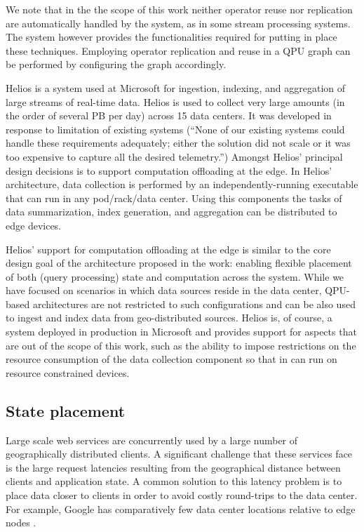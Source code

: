 We note that in the the scope of this work neither operator reuse nor replication are automatically handled by the system,
as in some stream processing systems.
The system however provides the functionalities required for putting in place these techniques.
Employing operator replication and reuse in a QPU graph can be performed by configuring the graph accordingly.

\bigskip
\noindent
Helios \cite{potharaju:helios} is a system used at Microsoft for ingestion, indexing, and aggregation of large streams
of real-time data.
Helios is used to collect very large amounts (in the order of several PB per day) across 15 data centers.
It was developed in response to limitation of existing systems
(``None of our existing systems could handle these requirements adequately; either the solution did not scale or it was
too expensive to capture all the desired telemetry.'')
Amongst Helios' principal design decisions is to support computation offloading at the edge.
In Helios' architecture, data collection is performed by an independently-running executable that can run in any pod/rack/data center.
Using this components the tasks of data summarization, index generation, and aggregation can be distributed to edge devices.

Helios' support for computation offloading at the edge is similar to the core design goal of the architecture proposed in the work:
enabling flexible placement of both (query processing) state and computation across the system.
While we have focused on scenarios in which data sources reside in the data center,
QPU-based architectures are not restricted to such configurations and can be also used to ingest and index data from geo-distributed
sources.
Helios is, of course, a system deployed in production in Microsoft and provides support for aspects that are out of the
scope of this work, such as the ability to impose restrictions on the resource consumption of the data collection component
so that in can run on resource constrained devices.

\subsection{State placement}
\label{sec:placement_state}
Large scale web services are concurrently used by a large number of geographically distributed clients.
A significant challenge that these services face is the large request latencies resulting from the geographical distance
between clients and application state.
A common solution to this latency problem is to place data closer to clients in order to avoid costly round-trips
to the data center.
For example, Google has comparatively few data center locations relative to edge nodes \cite{google:infra}.

